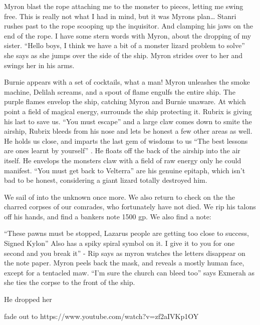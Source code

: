 Myron blast the rope attaching me to the monster to pieces, letting me swing free. This is really not what I had in mind, but it was Myrons plan… Stanri rushes past to the rope scooping up the inquisitor. And clamping his jaws on the end of the rope. I have some stern words with Myron, about the dropping of my sister. “Hello boys, I think we have a bit of a monster lizard problem to solve” she says as she jumps over the side of the ship. Myron strides over to her and swings her in his arms.\medskip

Burnie appears with a set of cocktails, what a man! Myron unleashes the smoke machine, Delilah screams, and a spout of flame engulfs the entire ship. The purple flames envelop the ship, catching Myron and Burnie unaware. At which point a field of magical energy, surrounds the ship protecting it. Rubrix is giving his last to save us. “You must escape” and a large claw comes down to smite the airship, Rubrix bleeds from his nose and lets be honest a few other areas as well. He holds us close, and imparts the last gem of wisdoms to us “The best lessons are ones learnt by yourself” . He floats off the back of the airship into the air itself. He envelops the monsters claw with a field of raw energy only he could manifest. “You must get back to Velterra” are his genuine epitaph, which isn’t bad to be honest, considering a giant lizard totally destroyed him.\medskip

We sail of into the unknown once more. We also return to check on the the charred corpses of our comrades, who fortunately have not died. We rip his talons off his hands, and find a bankers note 1500 gp. We also find a note:\medskip

“These pawns must be stopped, Lazarus people are getting too close to success, Signed Kylon” Also has a spiky spiral symbol on it. I give it to you for one second and you break it” - Rip says as myron watches the letters disappear on the note paper. Myron peels back the mask, and reveals a mostly human face, except for a tentacled maw. “I’m sure the church can bleed too” says Exmerah as she ties the corpse to the front of the ship.\medskip

He dropped her\medskip

fade out to https://www.youtube.com/watch?v=zf2aIVKp1OY\medskip



\vspace*{5mm}


